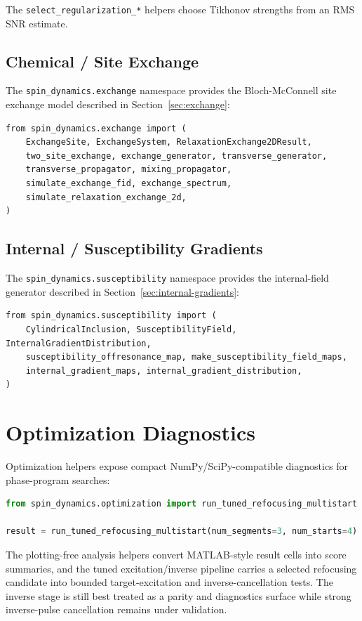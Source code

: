 \documentclass[11pt,oneside]{report}
\newcommand{\code}[1]{\texttt{#1}}
\begin{document}
The \code{select\_regularization\_*} helpers choose Tikhonov strengths from an
RMS SNR estimate.

\subsection{Chemical / Site Exchange}

The \code{spin\_dynamics.exchange} namespace provides the Bloch-McConnell site
exchange model described in Section~\ref{sec:exchange}:

\begin{lstlisting}
from spin_dynamics.exchange import (
    ExchangeSite, ExchangeSystem, RelaxationExchange2DResult,
    two_site_exchange, exchange_generator, transverse_generator,
    transverse_propagator, mixing_propagator,
    simulate_exchange_fid, exchange_spectrum,
    simulate_relaxation_exchange_2d,
)
\end{lstlisting}

\subsection{Internal / Susceptibility Gradients}

The \code{spin\_dynamics.susceptibility} namespace provides the internal-field
generator described in Section~\ref{sec:internal-gradients}:

\begin{lstlisting}
from spin_dynamics.susceptibility import (
    CylindricalInclusion, SusceptibilityField, InternalGradientDistribution,
    susceptibility_offresonance_map, make_susceptibility_field_maps,
    internal_gradient_maps, internal_gradient_distribution,
)
\end{lstlisting}

\section{Optimization Diagnostics}

Optimization helpers expose compact NumPy/SciPy-compatible diagnostics for
phase-program searches:

\begin{lstlisting}[language=Python]
from spin_dynamics.optimization import run_tuned_refocusing_multistart

result = run_tuned_refocusing_multistart(num_segments=3, num_starts=4)
\end{lstlisting}

The plotting-free analysis helpers convert MATLAB-style result cells into
score summaries, and the tuned excitation/inverse pipeline carries a selected
refocusing candidate into bounded target-excitation and inverse-cancellation
tests. The inverse stage is still best treated as a parity and diagnostics
surface while strong inverse-pulse cancellation remains under validation.
\end{document}
